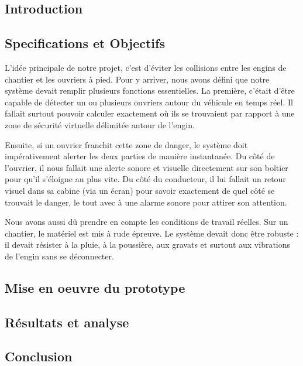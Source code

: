 \subsection{Introduction}



\subsection{Specifications et Objectifs }

L'idée principale de notre projet, c'est d'éviter les collisions entre les engins de chantier et les ouvriers à pied. Pour y arriver, nous avons défini que notre système devait remplir plusieurs fonctions essentielles. La première, c'était d'être capable de détecter un ou plusieurs ouvriers autour du véhicule en temps réel. Il fallait surtout pouvoir calculer exactement où ils se trouvaient par rapport à une zone de sécurité virtuelle délimitée autour de l'engin.


Ensuite, si un ouvrier franchit cette zone de danger, le système doit impérativement alerter les deux parties de manière instantanée. Du côté de l'ouvrier, il nous fallait une alerte sonore et visuelle directement sur son boîtier pour qu'il s'éloigne au plus vite. Du côté du conducteur, il lui fallait un retour visuel dans sa cabine (via un écran) pour savoir exactement de quel côté se trouvait le danger, le tout avec à une alarme sonore pour attirer son attention.


Nous avons aussi dû prendre en compte les conditions de travail réelles. Sur un chantier, le matériel est mis à rude épreuve. Le système devait donc être robuste : il devait résister à la pluie, à la poussière, aux gravats et surtout aux vibrations de l'engin sans se déconnecter. 


\subsection{Mise en oeuvre du prototype}


\subsection{Résultats et analyse}


\subsection{Conclusion }

